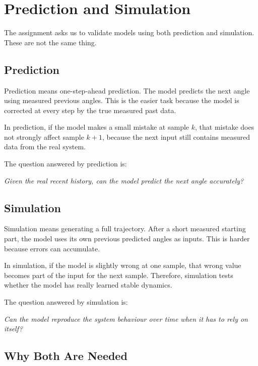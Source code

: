 \documentclass[11pt,a4paper]{article}
\begin{document}
\section{Prediction and Simulation}

The assignment asks us to validate models using both prediction and simulation.
These are not the same thing.

\subsection{Prediction}

Prediction means one-step-ahead prediction.
The model predicts the next angle using measured previous angles.
This is the easier task because the model is corrected at every step by the true measured past data.

In prediction, if the model makes a small mistake at sample $k$, that mistake does not strongly affect sample $k+1$, because the next input still contains measured data from the real system.

The question answered by prediction is:

\begin{center}
\textit{Given the real recent history, can the model predict the next angle accurately?}
\end{center}

\subsection{Simulation}

Simulation means generating a full trajectory.
After a short measured starting part, the model uses its own previous predicted angles as inputs.
This is harder because errors can accumulate.

In simulation, if the model is slightly wrong at one sample, that wrong value becomes part of the input for the next sample.
Therefore, simulation tests whether the model has really learned stable dynamics.

The question answered by simulation is:

\begin{center}
\textit{Can the model reproduce the system behaviour over time when it has to rely on itself?}
\end{center}

\subsection{Why Both Are Needed}
\end{document}
